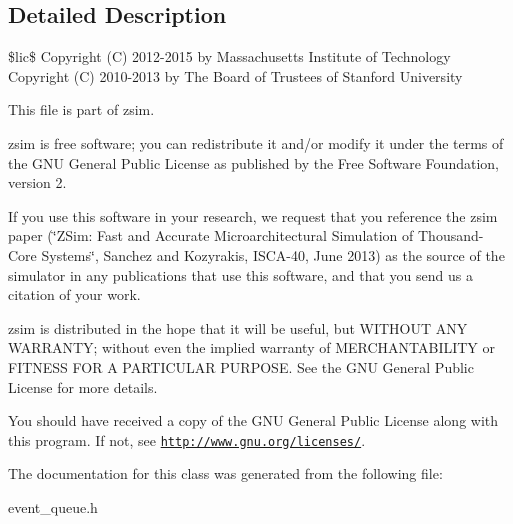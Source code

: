 \subsection{Detailed Description}
\$lic\$ Copyright (C) 2012-\/2015 by Massachusetts Institute of Technology Copyright (C) 2010-\/2013 by The Board of Trustees of Stanford University

This file is part of zsim.

zsim is free software; you can redistribute it and/or modify it under the terms of the G\-N\-U General Public License as published by the Free Software Foundation, version 2.

If you use this software in your research, we request that you reference the zsim paper (\char`\"{}\-Z\-Sim\-: Fast and Accurate Microarchitectural Simulation of
\-Thousand-\/\-Core Systems\char`\"{}, Sanchez and Kozyrakis, I\-S\-C\-A-\/40, June 2013) as the source of the simulator in any publications that use this software, and that you send us a citation of your work.

zsim is distributed in the hope that it will be useful, but W\-I\-T\-H\-O\-U\-T A\-N\-Y W\-A\-R\-R\-A\-N\-T\-Y; without even the implied warranty of M\-E\-R\-C\-H\-A\-N\-T\-A\-B\-I\-L\-I\-T\-Y or F\-I\-T\-N\-E\-S\-S F\-O\-R A P\-A\-R\-T\-I\-C\-U\-L\-A\-R P\-U\-R\-P\-O\-S\-E. See the G\-N\-U General Public License for more details.

You should have received a copy of the G\-N\-U General Public License along with this program. If not, see \href{http://www.gnu.org/licenses/}{\tt http\-://www.\-gnu.\-org/licenses/}. 

The documentation for this class was generated from the following file\-:\begin{DoxyCompactItemize}
\item 
event\-\_\-queue.\-h\end{DoxyCompactItemize}
